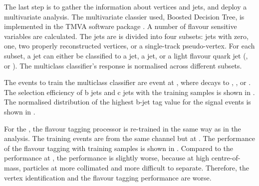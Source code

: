 The last step is to gather the information about vertices and jets, and deploy a multivariate analysis. The multivariate classier used, Boosted Decision Tree,  is implemented in the TMVA software package \cite{Hocker:2007ht}. A number of flavour sensitive variables are calculated. The jets are is divided into four subsets: jets with zero, one, two properly reconstructed vertices, or a single-track pseudo-vertex. For each subset, a jet can either be classified to a \Pbottom jet, a \Pcharm jet, or a light flavour quark jet (\Pup, \Pdown or \Pstrange). The multiclass classifier's response is normalised across different subsets.


The events to train the multiclass classifier are \HepProcess{\Pep \Pem \to \PZ \APnu \Pnu} event at , where \PZ decays to \HepProcess{\Pbottom\APbottom}, \HepProcess{\Pcharm\APcharm}, or \HepProcess{\Pup\APup/\Pdown\APdown/\Pstrange\APstrange}. The selection efficiency of b jets and c jets with the training samples is shown in . The normalised distribution of the highest b-jet tag value for the signal events is shown in .



For the , the flavour tagging processor is re-trained in the same way as in the  analysis. The training events are from the same channel but at . The performance of the flavour tagging  with training samples is shown in . Compared to the performance at , the performance is slightly worse, because at high centre-of-mass, particles at more collimated and more difficult to separate. Therefore, the vertex identification and the flavour tagging performance are worse.

